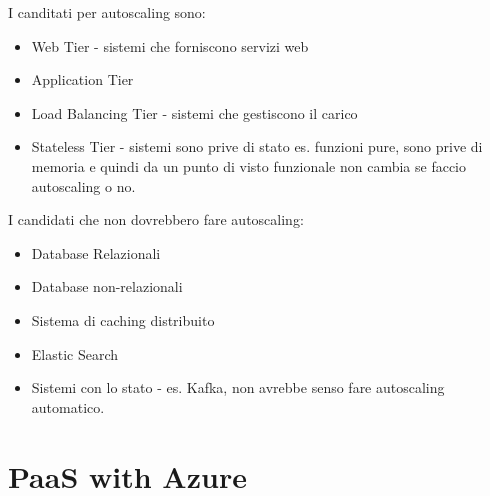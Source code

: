 \documentclass[11pt, twocolumn]{article}
\newenvironment{myitemize}
{ \begin{itemize}[topsep=0ex]
		\setlength{\itemsep}{0pt}
		\setlength{\parskip}{0pt}
		\setlength{\parsep}{0pt}     }
	{ \end{itemize}                  }
\begin{document}
I canditati per autoscaling sono:
\begin{myitemize}
	\item Web Tier - sistemi che forniscono servizi web
	\item Application Tier
	\item Load Balancing Tier - sistemi che gestiscono il carico
	\item Stateless Tier - sistemi sono prive di stato es. funzioni pure, sono prive di memoria e quindi da un punto di visto funzionale non cambia se faccio autoscaling o no.
\end{myitemize}
I candidati che non dovrebbero fare autoscaling:
\begin{myitemize}
	\item Database Relazionali
	\item Database non-relazionali
	\item Sistema di caching distribuito
	\item Elastic Search
	\item Sistemi con lo stato - es. Kafka, non avrebbe senso fare autoscaling automatico.
\end{myitemize}

\section{PaaS with Azure}
\end{document}
